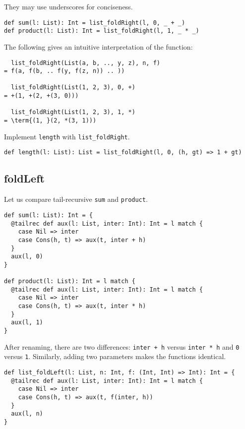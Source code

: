 They may use underscores for conciseness.

\begin{verbatim}
def sum(l: List): Int = list_foldRight(l, 0, _ + _)
def product(l: List): Int = list_foldRight(l, 1, _ * _)
\end{verbatim}

The following gives an intuitive interpretation of the function:

\begin{verbatim}
  list_foldRight(List(a, b, .., y, z), n, f)
= f(a, f(b, .. f(y, f(z, n)) .. ))

  list_foldRight(List(1, 2, 3), 0, +)
= +(1, +(2, +(3, 0)))

  list_foldRight(List(1, 2, 3), 1, *)
= \term{(1, }(2, *(3, 1)))
\end{verbatim}

Implement \verb!length! with \verb!list_foldRight!.

\begin{verbatim}
def length(l: List): List = list_foldRight(l, 0, (h, gt) => 1 + gt)
\end{verbatim}

\subsection{foldLeft}

Let us compare tail-recursive \verb!sum! and \verb!product!.

\begin{verbatim}
def sum(l: List): Int = {
  @tailrec def aux(l: List, inter: Int): Int = l match {
    case Nil => inter
    case Cons(h, t) => aux(t, inter + h)
  }
  aux(l, 0)
}

def product(l: List): Int = l match {
  @tailrec def aux(l: List, inter: Int): Int = l match {
    case Nil => inter
    case Cons(h, t) => aux(t, inter * h)
  }
  aux(l, 1)
}
\end{verbatim}

After renaming, there are two differences: \verb!inter + h! versus \verb!inter * h!
and \verb!0! versus \verb!1!. Similarly, adding two parameters makes the
functions identical.

\begin{verbatim}
def list_foldLeft(l: List, n: Int, f: (Int, Int) => Int): Int = {
  @tailrec def aux(l: List, inter: Int): Int = l match {
    case Nil => inter
    case Cons(h, t) => aux(t, f(inter, h))
  }
  aux(l, n)
}
\end{verbatim}

